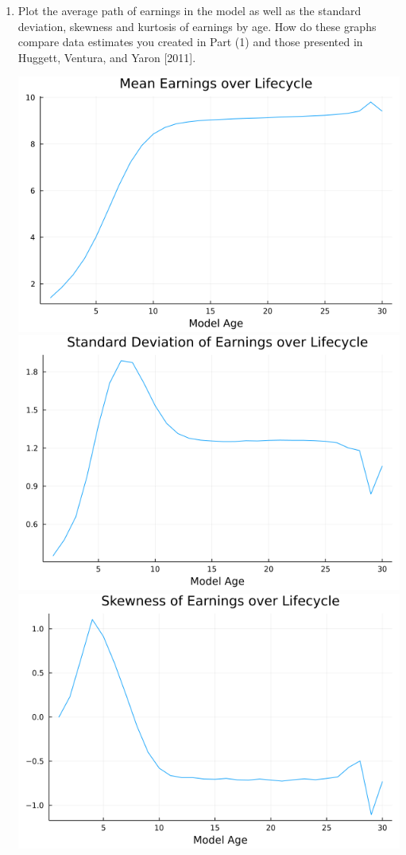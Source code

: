 \documentclass{article}
\begin{document}
\begin{enumerate}

\item  Plot the average path of earnings in the model as well as the standard deviation, skewness and kurtosis of earnings by age. How do these graphs compare data estimates you created in Part (1) and those presented in Huggett, Ventura, and Yaron [2011].

\begin{center}
\includegraphics[scale = 0.5]{figure_1_mean}
\includegraphics[scale = 0.5]{figure_1_sd}
\includegraphics[scale = 0.5]{figure_1_skewness}

\end{center}
\end{enumerate}
\end{document}
